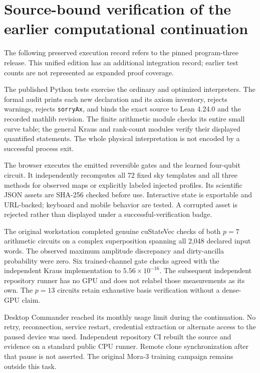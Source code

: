 \chapter{Source-bound verification of the earlier computational continuation}
The following preserved execution record refers to the pinned program-three release. This unified edition has an additional integration record; earlier test counts are not represented as expanded proof coverage.



The published Python tests exercise the ordinary and optimized interpreters. The formal audit prints each new declaration and its axiom inventory, rejects warnings, rejects \texttt{sorryAx}, and binds the exact source to Lean 4.24.0 and the recorded mathlib revision. The finite arithmetic module checks its entire small curve table; the general Kraus and rank-count modules verify their displayed quantified statements. The whole physical interpretation is not encoded by a successful process exit.

The browser executes the emitted reversible gates and the learned four-qubit circuit. It independently recomputes all 72 fixed sky templates and all three methods for observed maps or explicitly labeled injected profiles. Its scientific JSON assets are SHA-256 checked before use. Interactive state is exportable and URL-backed; keyboard and mobile behavior are tested. A corrupted asset is rejected rather than displayed under a successful-verification badge.

The original workstation completed genuine cuStateVec checks of both $p=7$ arithmetic circuits on a complex superposition spanning all 2,048 declared input words. The observed maximum amplitude discrepancy and dirty-ancilla probability were zero. Six trained-channel gate checks agreed with the independent Kraus implementation to $5.56\times10^{-16}$. The subsequent independent repository runner has no GPU and does not relabel those measurements as its own. The $p=13$ circuits retain exhaustive basis verification without a dense-GPU claim.

Desktop Commander reached its monthly usage limit during the continuation. No retry, reconnection, service restart, credential extraction or alternate access to the paused device was used. Independent repository CI rebuilt the source and evidence on a standard public CPU runner. Remote clone synchronization after that pause is not asserted. The original Mora-3 training campaign remains outside this task.

